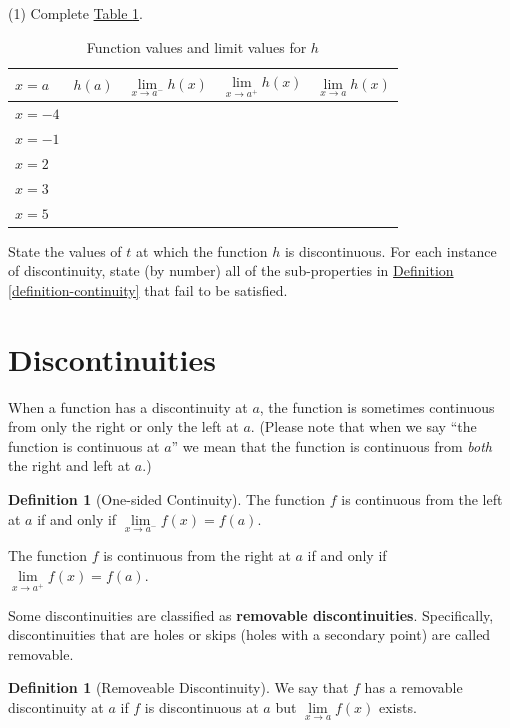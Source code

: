 \documentclass[12pt,]{book}
\newcommand{\terminology}[1]{\textbf{#1}}
\theoremstyle{plain}
\theoremstyle{definition}
\newtheorem{definition}[theorem]{Definition}
\numberwithin{equation}{section}
\newcommand{\fe}[2]{#1\mathopen{}\left(#2\right)\mathclose{}}
\begin{document}
\begin{exercisegroup}(1)
\exercise[1.]\hypertarget{exercise-109}{\null}Complete \hyperref[table-discontinuities]{Table \ref{table-discontinuities}}.%
\begin{table}
\centering
\caption{Function values and limit values for \(h\)\label{table-discontinuities}}
\begin{tabular}{l|cccc}
\toprule
\(x=a\)&\(\fe{h}{a}\)&\(\lim\limits_{x\to a^{-}}\fe{h}{x}\)&\(\lim\limits_{x\to a^{+}}\fe{h}{x}\)&\(\lim\limits_{x\to a}\fe{h}{x}\)\\
\midrule
\(x=-4\)&&&&\\
\midrule
\(x=-1\)&&&&\\
\midrule
\(x=2\)&&&&\\
\midrule
\(x=3\)&&&&\\
\midrule
\(x=5\)&&&&\\
\bottomrule
\end{tabular}
\end{table}
\exercise[2.]\hypertarget{exercise-110}{\null}State the values of \(t\) at which the function \(h\) is discontinuous. For each instance of discontinuity, state (by number) all of the sub-properties in \hyperref[definition-continuity]{Definition \ref{definition-continuity}} that fail to be satisfied.%
\end{exercisegroup}
\par\smallskip\noindent
\typeout{************************************************}
\typeout{************************************************}
\section[Discontinuities]{Discontinuities}\label{section-discontinuities}
When a function has a discontinuity at \(a\), the function is sometimes continuous from only the right or only the left at \(a\). (Please note that when we say ``the function is continuous at \(a\)'' we mean that the function is continuous from \emph{both} the right and left at \(a\).)%
\begin{definition}[One-sided Continuity]\label{definition-4}
The function \(f\) is continuous from the left at \(a\) if and only if \(\lim\limits_{x\to a^{-}}\fe{f}{x}=\fe{f}{a}\).%
\par
The function \(f\) is continuous from the right at \(a\) if and only if \(\lim\limits_{x\to a^{+}}\fe{f}{x}=\fe{f}{a}\).%
\end{definition}
\par
Some discontinuities are classified as \terminology{removable discontinuities}. Specifically, discontinuities that are holes or skips (holes with a secondary point) are called removable.%
\begin{definition}[Removeable Discontinuity]\label{definition-5}
We say that \(f\) has a removable discontinuity at \(a\) if \(f\) is discontinuous at \(a\) but \(\lim\limits_{x\to a}\fe{f}{x}\) exists.%
\end{definition}
\typeout{************************************************}
\typeout{************************************************}
\end{document}
